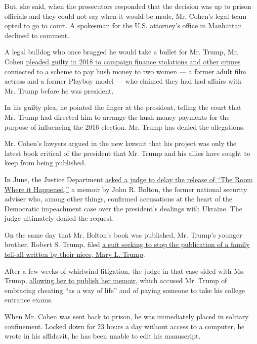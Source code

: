 But, she said, when the prosecutors responded that the decision was up
to prison officials and they could not say when it would be made, Mr.
Cohen's legal team opted to go to court. A spokesman for the U.S.
attorney's office in Manhattan declined to comment.

A legal bulldog who once bragged he would take a bullet for Mr. Trump,
Mr. Cohen
\href{https://slack-redir.net/link?url=https\%3A\%2F\%2Fwww.nytimes3xbfgragh.onion\%2F2018\%2F08\%2F21\%2Fnyregion\%2Fmichael-cohen-guilty-plea-trump-takeaways.html}{pleaded
guilty in 2018 to campaign finance violations and other crimes}
connected to a scheme to pay hush money to two women --- a former adult
film actress and a former Playboy model --- who claimed they had had
affairs with Mr. Trump before he was president.

In his guilty plea, he pointed the finger at the president, telling the
court that Mr. Trump had directed him to arrange the hush money payments
for the purpose of influencing the 2016 election. Mr. Trump has denied
the allegations.

Mr. Cohen's lawyers argued in the new lawsuit that his project was only
the latest book critical of the president that Mr. Trump and his allies
have sought to keep from being published.

In June, the Justice Department
\href{https://www.nytimes3xbfgragh.onion/2020/06/16/us/politics/john-bolton-book-publication.html}{asked
a judge to delay the release of ``The Room Where it Happened,''} a
memoir by John R. Bolton, the former national security adviser who,
among other things, confirmed accusations at the heart of the Democratic
impeachment case over the president's dealings with Ukraine. The judge
ultimately denied the request.

On the same day that Mr. Bolton's book was published, Mr. Trump's
younger brother, Robert S. Trump, filed
\href{https://www.nytimes3xbfgragh.onion/2020/06/23/us/politics/mary-trump-book-court.html}{a
suit seeking to stop the publication of a family tell-all written by
their niece, Mary L. Trump}.

After a few weeks of whirlwind litigation, the judge in that case sided
with Ms. Trump,
\href{https://www.nytimes3xbfgragh.onion/2020/07/07/us/politics/mary-trump-book.html}{allowing
her to publish her memoir}, which accused Mr. Trump of embracing
cheating ``as a way of life'' and of paying someone to take his college
entrance exams.

When Mr. Cohen was sent back to prison, he was immediately placed in
solitary confinement. Locked down for 23 hours a day without access to a
computer, he wrote in his affidavit, he has been unable to edit his
manuscript.

